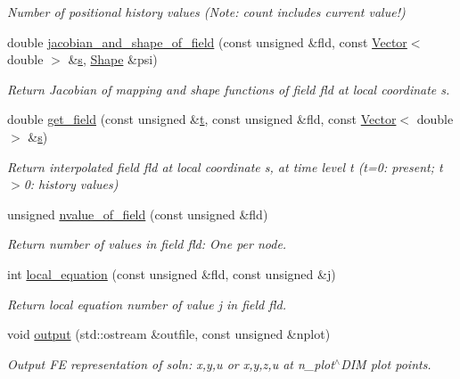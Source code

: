 \begin{DoxyCompactItemize}
\begin{DoxyCompactList}\small\item\em Number of positional history values (Note\+: count includes current value!) \end{DoxyCompactList}\item 
double \hyperlink{classoomph_1_1ProjectableFourierDecomposedHelmholtzElement_a7ba6062f40bc46b7c3e09fb77857aa19}{jacobian\+\_\+and\+\_\+shape\+\_\+of\+\_\+field} (const unsigned \&fld, const \hyperlink{classoomph_1_1Vector}{Vector}$<$ double $>$ \&\hyperlink{cfortran_8h_ab7123126e4885ef647dd9c6e3807a21c}{s}, \hyperlink{classoomph_1_1Shape}{Shape} \&psi)
\begin{DoxyCompactList}\small\item\em Return Jacobian of mapping and shape functions of field fld at local coordinate s. \end{DoxyCompactList}\item 
double \hyperlink{classoomph_1_1ProjectableFourierDecomposedHelmholtzElement_a163cc475f2675b5cc5e596ae9326df1b}{get\+\_\+field} (const unsigned \&\hyperlink{cfortran_8h_af6f0bd3dc13317f895c91323c25c2b8f}{t}, const unsigned \&fld, const \hyperlink{classoomph_1_1Vector}{Vector}$<$ double $>$ \&\hyperlink{cfortran_8h_ab7123126e4885ef647dd9c6e3807a21c}{s})
\begin{DoxyCompactList}\small\item\em Return interpolated field fld at local coordinate s, at time level t (t=0\+: present; t$>$0\+: history values) \end{DoxyCompactList}\item 
unsigned \hyperlink{classoomph_1_1ProjectableFourierDecomposedHelmholtzElement_ad01ff7bf92e3c532b9aeb83a11428782}{nvalue\+\_\+of\+\_\+field} (const unsigned \&fld)
\begin{DoxyCompactList}\small\item\em Return number of values in field fld\+: One per node. \end{DoxyCompactList}\item 
int \hyperlink{classoomph_1_1ProjectableFourierDecomposedHelmholtzElement_aa978ab56d0673a25ac99e9477198d942}{local\+\_\+equation} (const unsigned \&fld, const unsigned \&j)
\begin{DoxyCompactList}\small\item\em Return local equation number of value j in field fld. \end{DoxyCompactList}\item 
void \hyperlink{classoomph_1_1ProjectableFourierDecomposedHelmholtzElement_ad174e0b31d3c16cbbbebdfaaee769231}{output} (std\+::ostream \&outfile, const unsigned \&nplot)
\begin{DoxyCompactList}\small\item\em Output FE representation of soln\+: x,y,u or x,y,z,u at n\+\_\+plot$^\wedge$\+D\+IM plot points. \end{DoxyCompactList}\end{DoxyCompactItemize}
